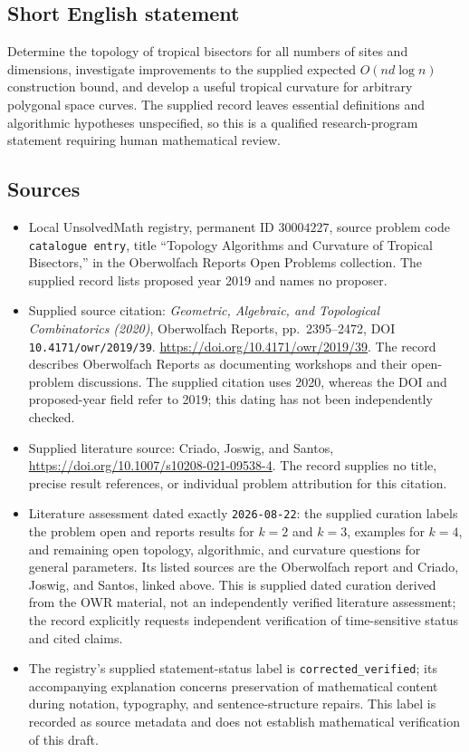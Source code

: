 \documentclass[11pt]{article}
\begin{document}
\subsection{Short English statement}
Determine the topology of tropical bisectors for all numbers of sites and dimensions, investigate improvements to the supplied expected \(O(nd\log n)\) construction bound, and develop a useful tropical curvature for arbitrary polygonal space curves. The supplied record leaves essential definitions and algorithmic hypotheses unspecified, so this is a qualified research-program statement requiring human mathematical review.
\subsection{Sources}
\begin{itemize}
\item Local UnsolvedMath registry, permanent ID \(30004227\), source problem code \texttt{catalogue entry}, title ``Topology Algorithms and Curvature of Tropical Bisectors,'' in the Oberwolfach Reports Open Problems collection. The supplied record lists proposed year 2019 and names no proposer.
\item Supplied source citation: \emph{Geometric, Algebraic, and Topological Combinatorics (2020)}, Oberwolfach Reports, pp.\ 2395--2472, DOI \texttt{10.4171/owr/2019/39}. \url{https://doi.org/10.4171/owr/2019/39}. The record describes Oberwolfach Reports as documenting workshops and their open-problem discussions. The supplied citation uses 2020, whereas the DOI and proposed-year field refer to 2019; this dating has not been independently checked.
\item Supplied literature source: Criado, Joswig, and Santos, \url{https://doi.org/10.1007/s10208-021-09538-4}. The record supplies no title, precise result references, or individual problem attribution for this citation.
\item Literature assessment dated exactly \texttt{2026-08-22}: the supplied curation labels the problem open and reports results for \(k=2\) and \(k=3\), examples for \(k=4\), and remaining open topology, algorithmic, and curvature questions for general parameters. Its listed sources are the Oberwolfach report and Criado, Joswig, and Santos, linked above. This is supplied dated curation derived from the OWR material, not an independently verified literature assessment; the record explicitly requests independent verification of time-sensitive status and cited claims.
\item The registry's supplied statement-status label is \texttt{corrected\_verified}; its accompanying explanation concerns preservation of mathematical content during notation, typography, and sentence-structure repairs. This label is recorded as source metadata and does not establish mathematical verification of this draft.
\end{itemize}
\end{document}
